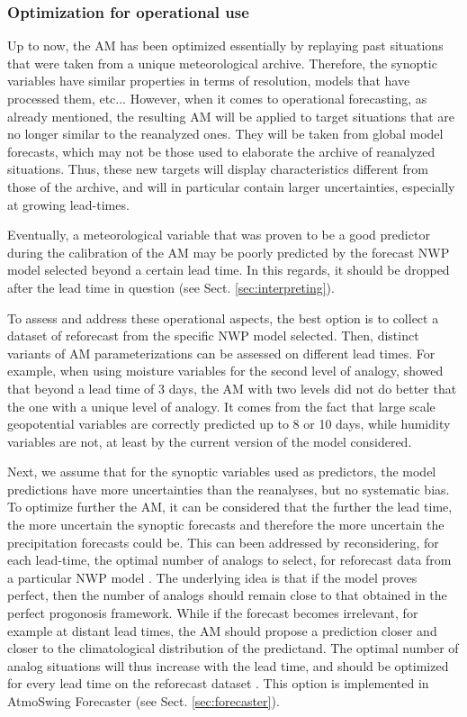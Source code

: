 \documentclass[review]{elsarticle}
\begin{document}
\subsubsection{Optimization for operational use}
\label{sec:optimization-operational}

Up to now, the AM has been optimized essentially by replaying past situations that were taken from a unique meteorological archive. Therefore, the synoptic variables have similar properties in terms of resolution, models that have processed them, etc... However, when it comes to operational forecasting, as already mentioned, the resulting AM will be applied to target situations that are no longer similar to the reanalyzed ones. They will be taken from global model forecasts, which may not be those used to elaborate the archive of reanalyzed situations. Thus, these new targets will display characteristics different from those of the archive, and will in particular contain larger uncertainties, especially at growing lead-times.

Eventually, a meteorological variable that was proven to be a good predictor during the calibration of the AM may be poorly predicted by the forecast NWP model selected beyond a certain lead time. In this regards, it should be dropped after the lead time in question (see Sect. \ref{sec:interpreting}).

To assess and address these operational aspects, the best option is to collect a dataset of reforecast from the specific NWP model selected. Then, distinct variants of AM parameterizations can be assessed on different lead times. For example, when using moisture variables for the second level of analogy, \citet{Thevenot2004} showed that beyond a lead time of 3 days, the AM with two levels did not do better that the one with a unique level of analogy. It comes from the fact that large scale geopotential variables are correctly predicted up to 8 or 10 days, while humidity variables are not, at least by the current version of the model considered.

Next, we assume that for the synoptic variables used as predictors, the model predictions have more uncertainties than the reanalyses, but no systematic bias. To optimize further the AM, it can be considered that the further the lead time, the more uncertain the synoptic forecasts and therefore the more uncertain the precipitation forecasts could be. This can been addressed by reconsidering, for each lead-time, the optimal number of analogs to select, for reforecast data from a particular NWP model \citep{Thevenot2004}. The underlying idea is that if the model proves perfect, then the number of analogs should remain close to that obtained in the perfect progonosis framework. While if the forecast becomes irrelevant, for example at distant lead times, the AM should propose a prediction closer and closer to the climatological distribution of the predictand. The optimal number of analog situations will thus increase with the lead time, and should be optimized for every lead time on the reforecast dataset \citep[see][for the details]{Thevenot2004}. This option is implemented in AtmoSwing Forecaster (see Sect. \ref{sec:forecaster}).
\end{document}
